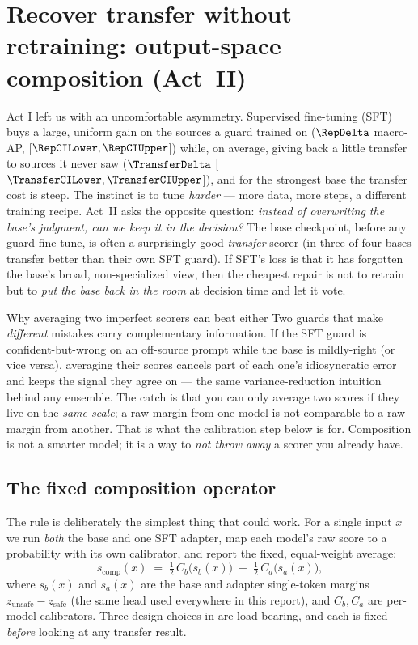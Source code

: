 \section{Recover transfer without retraining: output-space composition (Act~II)}
\label{sec:actIII}

Act I left us with an uncomfortable asymmetry. Supervised fine-tuning (SFT) buys a large,
uniform gain on the sources a guard trained on ($\RepDelta$ macro-AP,
[$\RepCILower,\RepCIUpper$]) while, on average, giving back a little transfer to sources it
never saw ($\TransferDelta$ [$\TransferCILower,\TransferCIUpper$]), and for the strongest
base the transfer cost is steep. The instinct is to tune \emph{harder} --- more data, more
steps, a different training recipe. Act~II asks the opposite question:
\emph{instead of overwriting the base's judgment, can we keep it in the decision?} The base
checkpoint, before any guard fine-tune, is often a surprisingly good \emph{transfer} scorer
(in  three of four bases transfer better than their own SFT guard). If SFT's
loss is that it has forgotten the base's broad, non-specialized view, then the cheapest repair
is not to retrain but to \emph{put the base back in the room} at decision time and let it vote.

\begin{background}{Why averaging two imperfect scorers can beat either}
Two guards that make \emph{different} mistakes carry complementary information. If the SFT guard
is confident-but-wrong on an off-source prompt while the base is mildly-right (or vice versa),
averaging their scores cancels part of each one's idiosyncratic error and keeps the signal they
agree on --- the same variance-reduction intuition behind any ensemble. The catch is that you
can only average two scores if they live on the \emph{same scale}; a raw margin from one model
is not comparable to a raw margin from another. That is what the calibration step below is for.
Composition is not a smarter model; it is a way to \emph{not throw away} a scorer you already
have.
\end{background}

\subsection{The fixed composition operator}
\label{sec:actIII-operator}

The rule is deliberately the simplest thing that could work. For a single input $x$ we run
\emph{both} the base and one SFT adapter, map each model's raw score to a probability with its
own calibrator, and report the fixed, equal-weight average:
\begin{equation}
s_{\mathrm{comp}}(x) \;=\; \tfrac12\, C_b\!\big(s_b(x)\big) \;+\; \tfrac12\, C_{a}\!\big(s_{a}(x)\big),
\label{eq:comp}
\end{equation}
where $s_b(x)$ and $s_a(x)$ are the base and adapter single-token margins
$z_{\text{unsafe}}-z_{\text{safe}}$ (the same head used everywhere in this report), and
$C_b,C_a$ are per-model calibrators. Three design choices in  are load-bearing,
and each is fixed \emph{before} looking at any transfer result.

